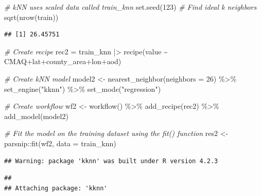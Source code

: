 \documentclass[
]{article}
\newenvironment{Shaded}{\begin{snugshade}}{\end{snugshade}}
\newcommand{\AttributeTok}[1]{\textcolor[rgb]{0.77,0.63,0.00}{#1}}
\newcommand{\CommentTok}[1]{\textcolor[rgb]{0.56,0.35,0.01}{\textit{#1}}}
\newcommand{\DecValTok}[1]{\textcolor[rgb]{0.00,0.00,0.81}{#1}}
\newcommand{\FunctionTok}[1]{\textcolor[rgb]{0.00,0.00,0.00}{#1}}
\newcommand{\NormalTok}[1]{#1}
\newcommand{\OtherTok}[1]{\textcolor[rgb]{0.56,0.35,0.01}{#1}}
\newcommand{\SpecialCharTok}[1]{\textcolor[rgb]{0.00,0.00,0.00}{#1}}
\newcommand{\StringTok}[1]{\textcolor[rgb]{0.31,0.60,0.02}{#1}}
\begin{document}
\begin{Shaded}
\begin{Highlighting}[]
\CommentTok{\# kNN uses scaled data called train\_knn}
\FunctionTok{set.seed}\NormalTok{(}\DecValTok{123}\NormalTok{)}
\CommentTok{\# Find ideal k neighbors}
\FunctionTok{sqrt}\NormalTok{(}\FunctionTok{nrow}\NormalTok{(train))}
\end{Highlighting}
\end{Shaded}

\begin{verbatim}
## [1] 26.45751
\end{verbatim}

\begin{Shaded}
\begin{Highlighting}[]
\CommentTok{\# Create recipe}
\NormalTok{rec2 }\OtherTok{=}\NormalTok{ train\_knn }\SpecialCharTok{|\textgreater{}} \FunctionTok{recipe}\NormalTok{(value }\SpecialCharTok{\textasciitilde{}}\NormalTok{ CMAQ}\SpecialCharTok{+}\NormalTok{lat}\SpecialCharTok{+}\NormalTok{county\_area}\SpecialCharTok{+}\NormalTok{lon}\SpecialCharTok{+}\NormalTok{aod)}

\CommentTok{\# Create kNN model}
\NormalTok{model2 }\OtherTok{\textless{}{-}} \FunctionTok{nearest\_neighbor}\NormalTok{(}\AttributeTok{neighbors =} \DecValTok{26}\NormalTok{) }\SpecialCharTok{\%\textgreater{}\%} 
    \FunctionTok{set\_engine}\NormalTok{(}\StringTok{"kknn"}\NormalTok{) }\SpecialCharTok{\%\textgreater{}\%} 
    \FunctionTok{set\_mode}\NormalTok{(}\StringTok{"regression"}\NormalTok{)}

\CommentTok{\# Create workflow}
\NormalTok{  wf2 }\OtherTok{\textless{}{-}} \FunctionTok{workflow}\NormalTok{() }\SpecialCharTok{\%\textgreater{}\%} 
    \FunctionTok{add\_recipe}\NormalTok{(rec2) }\SpecialCharTok{\%\textgreater{}\%} 
    \FunctionTok{add\_model}\NormalTok{(model2)}

\CommentTok{\# Fit the model on the training dataset using the \textasciigrave{}fit()\textasciigrave{} function}
\NormalTok{res2 }\OtherTok{\textless{}{-}}\NormalTok{ parsnip}\SpecialCharTok{::}\FunctionTok{fit}\NormalTok{(wf2, }\AttributeTok{data =}\NormalTok{ train\_knn)}
\end{Highlighting}
\end{Shaded}

\begin{verbatim}
## Warning: package 'kknn' was built under R version 4.2.3
\end{verbatim}

\begin{verbatim}
## 
## Attaching package: 'kknn'
\end{verbatim}
\end{document}
